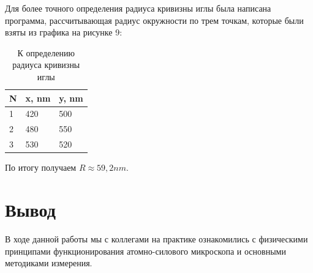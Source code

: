 \documentclass[a4paper]{article}
\begin{document}
Для более точного определения радиуса кривизны иглы была написана программа, рассчитывающая радиус окружности по трем точкам, которые были взяты из графика на рисунке 9:
\begin{table}[h]
    \centering
    \begin{center}
    \caption{К определению радиуса кривизны иглы}
    \end{center}
    \vspace{0.1cm}
    \label{tab:my_label}
    \begin{tabular}{|p{1cm}|p{1cm}|p{1cm}|}
 \hline
 N & x, nm & y, nm\\
 \hline
1 & 420 & 500\\
 \hline
2 & 480 & 550\\
 \hline
3 & 530 & 520\\
 \hline
\end{tabular}
\end{table}

По итогу получаем \textit{$R \approx 59,2 nm$}.



\section{Вывод}
В ходе данной работы мы с коллегами на практике ознакомились с физическими принципами функционирования атомно-силового микроскопа и основными методиками измерения. 

\newpage
\end{document}
